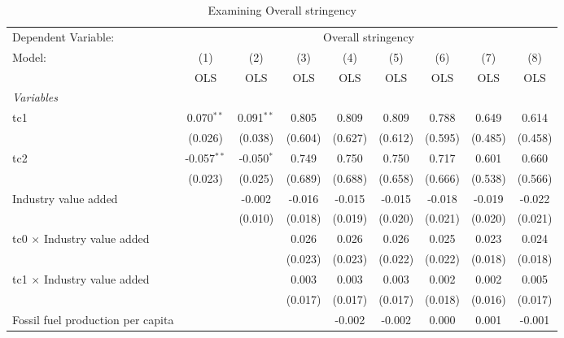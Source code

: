 
\begin{table}[htbp]
   \caption{Examining Overall stringency}
   \centering
   \begin{tabular}{lcccccccc}
      \toprule
      Dependent Variable: & \multicolumn{8}{c}{Overall stringency}\\
      Model:                                  & (1)           & (2)          & (3)     & (4)     & (5)     & (6)     & (7)     & (8)\\  
                                              &  OLS          & OLS          & OLS     & OLS     & OLS     & OLS     & OLS     & OLS\\  
      \midrule
      \emph{Variables}\\
      tc1                                     & 0.070$^{**}$  & 0.091$^{**}$ & 0.805   & 0.809   & 0.809   & 0.788   & 0.649   & 0.614\\   
                                              & (0.026)       & (0.038)      & (0.604) & (0.627) & (0.612) & (0.595) & (0.485) & (0.458)\\   
      tc2                                     & -0.057$^{**}$ & -0.050$^{*}$ & 0.749   & 0.750   & 0.750   & 0.717   & 0.601   & 0.660\\   
                                              & (0.023)       & (0.025)      & (0.689) & (0.688) & (0.658) & (0.666) & (0.538) & (0.566)\\   
      Industry value added                    &               & -0.002       & -0.016  & -0.015  & -0.015  & -0.018  & -0.019  & -0.022\\   
                                              &               & (0.010)      & (0.018) & (0.019) & (0.020) & (0.021) & (0.020) & (0.021)\\   
      tc0 $\times$ Industry value added       &               &              & 0.026   & 0.026   & 0.026   & 0.025   & 0.023   & 0.024\\   
                                              &               &              & (0.023) & (0.023) & (0.022) & (0.022) & (0.018) & (0.018)\\   
      tc1 $\times$ Industry value added       &               &              & 0.003   & 0.003   & 0.003   & 0.002   & 0.002   & 0.005\\   
                                              &               &              & (0.017) & (0.017) & (0.017) & (0.018) & (0.016) & (0.017)\\   
      Fossil fuel production per capita       &               &              &         & -0.002  & -0.002  & 0.000   & 0.001   & -0.001\\   

\end{tabular}
\end{table}
